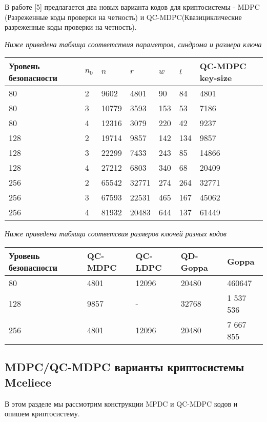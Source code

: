 \documentclass[12pt]{article}
\begin{document}
В работе [5] предлагается два новых варианта кодов для криптосистемы - MDPC
(Разреженные коды проверки на четность) и QC-MDPC(Квазициклические разреженные коды проверки на четность).  
\begin{center}
\newpage
\textit{Ниже приведена таблица соответствия параметров, синдрома и размера ключа}\\
\begin{tabular}[t]{|p{6em}|p{1em}|p{3em}|p{3em}|p{3em}|p{3em}|p{5em}|}
\hline
Уровень безопасности & $n_{0}$ & $n$ & $r$ & $w$ & $t$ & QC-MDPC key-size\\
\hline
\hline
 80 & 2 & 9602 & 4801 & 90 & 84 & 4801 \\
\hline
 80 & 3 & 10779 & 3593 & 153 & 53 & 7186 \\
\hline
 80 & 4 & 12316 & 3079 & 220 & 42 & 9237 \\
\hline
\hline
 128 & 2 & 19714 & 9857 & 142 & 134 & 9857 \\
\hline
 128 & 3 & 22299 & 7433 & 243 & 85 & 14866 \\
\hline 
 128 & 4 & 27212 & 6803 & 340 & 68 & 20409 \\
\hline 
\hline
 256 & 2 & 65542 & 32771 & 274 & 264 & 32771 \\
\hline
 256 & 3 & 67593 & 22531 & 465 & 167 & 45062 \\
\hline 
 256 & 4 & 81932 & 20483 & 644 & 137 & 61449 \\
\hline
\end{tabular}
\end{center}

\begin{center}
\textit{Ниже приведена таблица соответсвия размеров ключей разных кодов}
\begin{tabular}[t]{|p{6em}|p{6em}|p{6em}|p{6em}|p{6em}|}
\hline
Уровень безопасности & QC-MDPC & QC-LDPC & QD-Goppa & Goppa \\
\hline
\hline
80 & 4801 & 12096 & 20480 & 460647 \\
\hline
128 & 9857 & - & 32768 & 1 537 536 \\
\hline
256 & 4801 & 12096 & 20480 & 7 667 855 \\
\hline
\end{tabular}
\end{center}
\subsection{MDPC/QC-MDPC варианты криптосистемы Mceliece}

В этом разделе мы рассмотрим конструкции MPDC и QC-MDPC кодов и опишем криптосистему.
\end{document}

